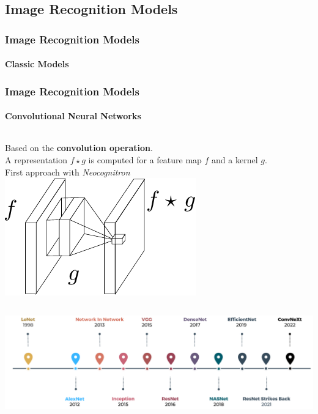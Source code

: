 \subsection*{Image Recognition Models}
\begin{frame}[t]
    \frametitle{Image Recognition Models}
    \framesubtitle{Classic Models}
\end{frame}
\begin{frame}[t]
    \frametitle{Image Recognition Models}
    \framesubtitle{Convolutional Neural Networks}
    \begin{columns}
        {\footnotesize Based on the \textbf{convolution operation}.\\
         A representation $f\star g$ is computed for a feature map $f$ and a kernel $g$.\\
         First approach with \emph{Neocognitron} \cite{fukushima1975cognitron}}
            \includegraphics[scale=0.75]{fig/rel/imrecon/img/conv_schema.pdf}
    \end{columns}\pause
    \begin{center}
        {\includegraphics[width=\textwidth]{fig/rel/imrecon/img/CNN_timeline.pdf}}
    \end{center}
        
\end{frame}
